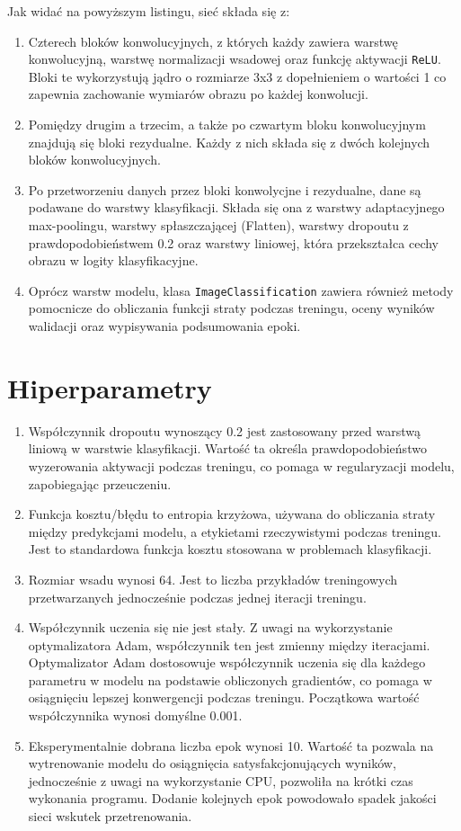 \documentclass[11pt]{article}
\begin{document}
	Jak widać na powyższym listingu, sieć składa się z:
	\begin{enumerate}
		\item Czterech bloków konwolucyjnych, z których każdy zawiera warstwę konwolucyjną, warstwę normalizacji
			wsadowej oraz funkcję aktywacji \texttt{ReLU}. Bloki te wykorzystują jądro o rozmiarze 3x3 z dopełnieniem o wartości 1
			co zapewnia zachowanie wymiarów obrazu po każdej konwolucji.
		\item Pomiędzy drugim a trzecim, a także po czwartym bloku konwolucyjnym znajdują się bloki rezydualne. Każdy
			z nich składa się z dwóch kolejnych bloków konwolucyjnych.
		\item Po przetworzeniu danych przez bloki konwolycjne i rezydualne, dane są podawane do warstwy klasyfikacji.
			Składa się ona z warstwy adaptacyjnego max-poolingu, warstwy spłaszczającej (Flatten), warstwy dropoutu z prawdopodobieństwem 0.2
			oraz warstwy liniowej, która przekształca cechy obrazu w logity klasyfikacyjne.
		\item Oprócz warstw modelu, klasa \texttt{ImageClassification} zawiera również metody pomocnicze do obliczania funkcji straty podczas treningu,
			oceny wyników walidacji oraz wypisywania podsumowania epoki.
	\end{enumerate}

	\section{Hiperparametry}
	\begin{enumerate}
		\item Współczynnik dropoutu wynoszący 0.2 jest zastosowany przed warstwą liniową w warstwie klasyfikacji.
			Wartość ta określa prawdopodobieństwo wyzerowania aktywacji podczas treningu, co pomaga w regularyzacji modelu, zapobiegając przeuczeniu.
		\item Funkcja kosztu/błędu to entropia krzyżowa, używana do obliczania straty między predykcjami modelu, a etykietami
			rzeczywistymi podczas treningu. Jest to standardowa funkcja kosztu stosowana w problemach klasyfikacji.
		\item Rozmiar wsadu wynosi 64. Jest to liczba przykładów treningowych przetwarzanych jednocześnie podczas jednej iteracji treningu.
		\item Współczynnik uczenia się nie jest stały. Z uwagi na wykorzystanie optymalizatora Adam, współczynnik ten jest zmienny między iteracjami. 
			Optymalizator Adam dostosowuje współczynnik uczenia się dla każdego parametru w modelu na podstawie obliczonych gradientów, co pomaga w osiągnięciu lepszej konwergencji podczas treningu.
			Początkowa wartość współczynnika wynosi domyślne 0.001.
		\item Eksperymentalnie dobrana liczba epok wynosi 10. Wartość ta pozwala na wytrenowanie modelu do osiągnięcia satysfakcjonujących wyników, jednocześnie z uwagi na wykorzystanie CPU, pozwoliła na 
			krótki czas wykonania programu. Dodanie kolejnych epok powodowało spadek jakości sieci wskutek przetrenowania.
	\end{enumerate}
\end{document}
